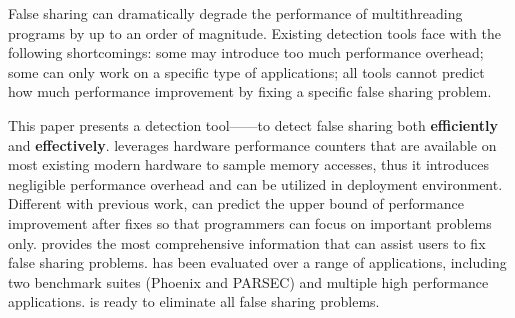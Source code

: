 False sharing can dramatically degrade the performance of multithreading programs by up to an order of magnitude. 
Existing detection tools face with the following shortcomings: some may introduce too much performance overhead; some can only work on a specific type of applications; all tools cannot predict how much performance improvement by fixing a specific false sharing problem. 

This paper presents a detection tool---\cheetah{}---to detect false sharing both {\bf efficiently} and {\bf effectively}. \cheetah{} leverages hardware performance counters that are available on most existing modern hardware to sample memory accesses, thus it introduces negligible performance overhead and can be utilized in deployment environment. Different with previous work, \cheetah{} can predict the upper bound of performance improvement after fixes so that programmers can focus on important problems only. \cheetah{} provides the most comprehensive information that can assist users to fix false sharing problems. \cheetah{} has been evaluated over a range of applications, including two benchmark suites (Phoenix and PARSEC) and multiple high performance applications. \Cheetah{} is ready to eliminate all false sharing problems.  